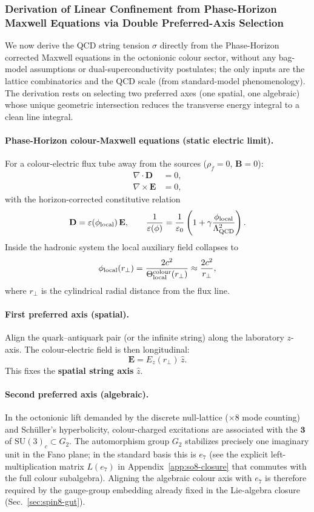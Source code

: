\documentclass[12pt,a4paper]{article}
\begin{document}
\subsubsection{Derivation of Linear Confinement from Phase-Horizon Maxwell Equations via Double Preferred-Axis Selection}

We now derive the QCD string tension $\sigma$ directly from the Phase-Horizon corrected Maxwell equations in the octonionic colour sector, without any bag-model assumptions or dual-superconductivity postulates; the only inputs are the lattice combinatorics and the QCD scale (from standard-model phenomenology). The derivation rests on selecting two preferred axes (one spatial, one algebraic) whose unique geometric intersection reduces the transverse energy integral to a clean line integral.

\paragraph{Phase-Horizon colour-Maxwell equations (static electric limit).}
For a colour-electric flux tube away from the sources ($\rho_f=0$, $\mathbf{B}=0$):
\begin{align}
\nabla \cdot \mathbf{D} &= 0, \\
\nabla \times \mathbf{E} &= 0,
\end{align}
with the horizon-corrected constitutive relation
\[
\mathbf{D} = \varepsilon(\phi_{\rm local})\,\mathbf{E}, \qquad
\frac{1}{\varepsilon(\phi)} = \frac{1}{\varepsilon_0}\left(1 + \gamma \frac{\phi_{\rm local}}{\Lambda_{\rm QCD}^2}\right).
\]
Inside the hadronic system the local auxiliary field collapses to
\[
\phi_{\rm local}(r_\perp) = \frac{2c^2}{\Theta_{\rm local}^{\rm colour}(r_\perp)} \approx \frac{2c^2}{r_\perp},
\]
where $r_\perp$ is the cylindrical radial distance from the flux line.

\paragraph{First preferred axis (spatial).} 
Align the quark--antiquark pair (or the infinite string) along the laboratory $z$-axis. The colour-electric field is then longitudinal:
\[
\mathbf{E} = E_z(r_\perp)\,\hat{z}.
\]
This fixes the \textbf{spatial string axis} $\hat{z}$.

\paragraph{Second preferred axis (algebraic).} 
In the octonionic lift demanded by the discrete null-lattice ($\times 8$ mode counting) and Sch\"uller's hyperbolicity, colour-charged excitations are associated with the $\mathbf{3}$ of $\mathrm{SU}(3)_c \subset G_2$. The automorphism group $G_2$ stabilizes precisely one imaginary unit in the Fano plane; in the standard basis this is $e_7$ (see the explicit left-multiplication matrix $L(e_7)$ in Appendix~\ref{app:so8-closure} that commutes with the full colour subalgebra). Aligning the algebraic colour axis with $e_7$ is therefore required by the gauge-group embedding already fixed in the Lie-algebra closure (Sec.~\ref{sec:spin8-gut}).
\end{document}

